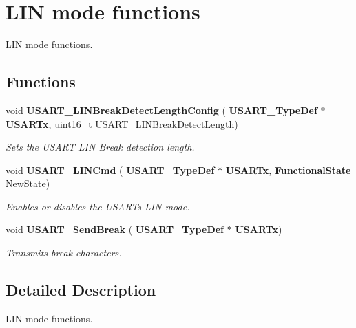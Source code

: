 \section{L\+IN mode functions}
\label{group__USART__Group4}


L\+IN mode functions.  


\subsection*{Functions}
\begin{DoxyCompactItemize}
\item 
void \textbf{ U\+S\+A\+R\+T\+\_\+\+L\+I\+N\+Break\+Detect\+Length\+Config} (\textbf{ U\+S\+A\+R\+T\+\_\+\+Type\+Def} $\ast$\textbf{ U\+S\+A\+R\+Tx}, uint16\+\_\+t U\+S\+A\+R\+T\+\_\+\+L\+I\+N\+Break\+Detect\+Length)
\begin{DoxyCompactList}\small\item\em Sets the U\+S\+A\+RT L\+IN Break detection length. \end{DoxyCompactList}\item 
void \textbf{ U\+S\+A\+R\+T\+\_\+\+L\+I\+N\+Cmd} (\textbf{ U\+S\+A\+R\+T\+\_\+\+Type\+Def} $\ast$\textbf{ U\+S\+A\+R\+Tx}, \textbf{ Functional\+State} New\+State)
\begin{DoxyCompactList}\small\item\em Enables or disables the U\+S\+A\+RT\textquotesingle{}s L\+IN mode. \end{DoxyCompactList}\item 
void \textbf{ U\+S\+A\+R\+T\+\_\+\+Send\+Break} (\textbf{ U\+S\+A\+R\+T\+\_\+\+Type\+Def} $\ast$\textbf{ U\+S\+A\+R\+Tx})
\begin{DoxyCompactList}\small\item\em Transmits break characters. \end{DoxyCompactList}\end{DoxyCompactItemize}


\subsection{Detailed Description}
L\+IN mode functions. 

